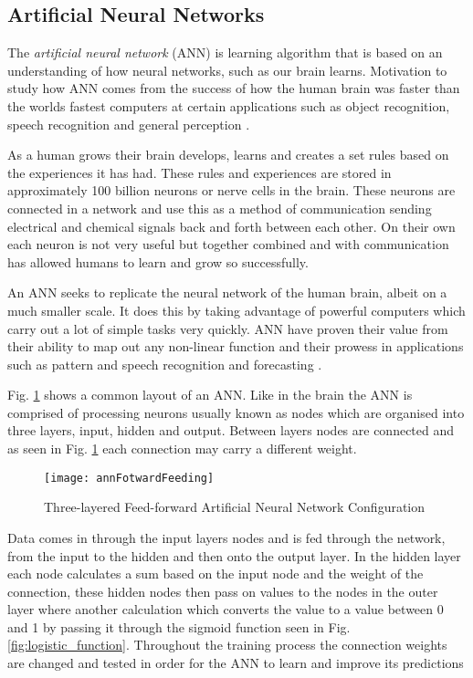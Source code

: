 \subsection{Artificial Neural Networks} \label{neuralNets}
The \textit{artificial neural network} (ANN) is learning algorithm that is based on an understanding of how neural networks, such as our brain learns. Motivation to study how ANN comes from the success of how the human brain was faster than the worlds fastest computers at certain applications such as object recognition, speech recognition and general perception \citep{haykin_neural_1998}.

As a human grows their brain develops, learns and creates a set rules based on the experiences it has had. These rules and experiences are stored in approximately 100 billion neurons or nerve cells in the brain. These neurons are connected in a network and use this as a method of communication sending electrical and chemical signals back and forth between each other. On their own each neuron is not very useful but together combined and with communication has allowed humans to learn and grow so successfully. 

An ANN seeks to replicate the neural network of the human brain, albeit on a much smaller scale. It does this by taking advantage of powerful computers which carry out a lot of simple tasks very quickly. ANN have proven their value from their ability to map out any non-linear function \citep{white_learning_1989} and their prowess in applications such as pattern and speech recognition and forecasting \citep{kaastra_forecasting_1995}.

Fig. \ref{fig:annFotwardFeeding} shows a common layout of an ANN. Like in the brain the ANN is comprised of processing neurons usually known as nodes which are organised into three layers, input, hidden and output. Between layers nodes are connected and as seen in Fig. \ref{fig:annFotwardFeeding} each connection may carry a different weight.

\begin{figure}[H]
	\texttt{[image: annFotwardFeeding]}
	\caption{Three-layered Feed-forward Artificial Neural Network Configuration \\
				\cite[Source:][]{raju_development_2011}
			}
	\label{fig:annFotwardFeeding}
\end{figure}

Data comes in through the input layers nodes and is fed through the network, from the input to the hidden and then onto the output layer. In the hidden layer each node calculates a sum based on the input node and the weight of the connection, these hidden nodes then pass on values to the nodes in the outer layer where another calculation which converts the value to a value between 0 and 1 by passing it through the sigmoid function seen in Fig. \ref{fig:logistic_function}. Throughout the training process the connection weights are changed and tested in order for the ANN to learn and improve its predictions \citep{haykin_neural_1998}

